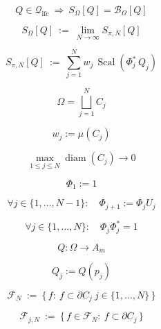 \documentclass[12pt]{article}
\begin{document}
\begin{equation}
Q\in\mathcal{Q}_{\mathrm{ifc}}\ \Longrightarrow\ S_\Omega[Q]=\mathcal{B}_\Omega[Q]
\end{equation}

\begin{equation}
S_\Omega[Q]\ :=\ \lim_{N\to\infty}S_{\pi,N}[Q]
\end{equation}

\begin{equation}
S_{\pi,N}[Q]\ :=\ \sum_{j=1}^N w_j\,\operatorname{Scal}\!\left(\Phi_j^*\,Q_j\right)
\end{equation}

\begin{equation}
\Omega=\bigsqcup_{j=1}^N C_j
\end{equation}

\begin{equation}
w_j:=\mu(C_j)
\end{equation}

\begin{equation}
\max_{1\le j\le N}\operatorname{diam}(C_j)\to 0
\end{equation}

\begin{equation}
\Phi_1:=1
\end{equation}

\begin{equation}
\forall j\in\{1,\dots,N-1\}:\quad \Phi_{j+1}:=\Phi_jU_j
\end{equation}

\begin{equation}
\forall j\in\{1,\dots,N\}:\quad \Phi_j\Phi_j^*=1
\end{equation}

\begin{equation}
Q:\Omega\to A_m
\end{equation}

\begin{equation}
Q_j:=Q(p_j)
\end{equation}

\begin{equation}
\mathcal{F}_N\ :=\ \bigl\{\,f:\ f\subset\partial C_j\ j\in\{1,\dots,N\}\,\bigr\}
\end{equation}

\begin{equation}
\mathcal{F}_{j,N}\ :=\ \bigl\{\,f\in\mathcal{F}_N:\ f\subset\partial C_j\,\bigr\}
\end{equation}
\end{document}
